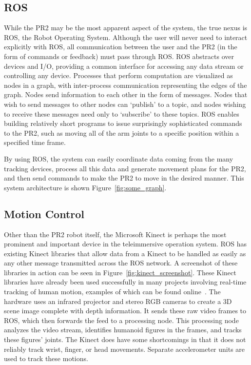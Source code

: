 \documentclass{sig-alternate}
\begin{document}
\subsection{ROS}
\label{sec:model_ros}
While the PR2 may be the most apparent aspect of the system,
the true nexus is ROS, the Robot Operating System. Although the
user will never need to interact explicitly with ROS, all communication between
the user and the PR2 (in the form of commands or feedback) must pass through ROS.
ROS abstracts over devices and I/O, providing a common interface for accessing
any data stream or controlling any device. Processes that perform computation are visualized as nodes in a graph, with inter-process communication representing the
edges of the graph. Nodes send information to each other in the form of messages. Nodes that wish to send messages to other nodes can
`publish' to a topic, and nodes wishing to receive these messages need only to `subscribe' to these topics. ROS enables building relatively short
programs to issue surprisingly sophisticated commands to the PR2, such as moving all of the arm joints to a specific position within a
specified time frame.

By using ROS, the system can easily coordinate
data coming from the many tracking devices, process all this data and generate
movement plans for the PR2, and then send commands to make the PR2 to move in the
desired manner. This system architecture is shown Figure~\ref{fig:some_graph}.

\subsection{Motion Control}
\label{sec:model_motion}
Other than the PR2 robot itself, the Microsoft Kinect is perhaps the most 
prominent and important device in the teleimmersive operation system. ROS has 
existing Kinect libraries that allow
data from a Kinect to be handled as easily as any other message transmitted across the ROS network. A screenshot
of these libraries in action can be seen in Figure~\ref{fig:kinect_screenshot}.
These Kinect libraries have already been used successfully in 
many projects involving real-time tracking of human motion, examples of which can be found online~\cite{freenect}.
The hardware uses an 
infrared projector and stereo RGB cameras to create a 3D scene image complete
with depth information. It sends these raw video frames to ROS, which then
forwards the feed to a processing node. This processing node analyzes the 
video stream, identifies humanoid figures in the frames, and tracks these 
figures' joints. The Kinect does have some shortcomings in that it does 
not reliably track wrist, finger, or head movements. Separate 
accelerometer units are used to track these motions.
\end{document}
